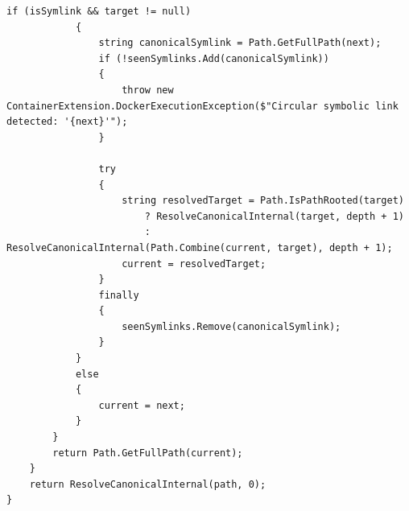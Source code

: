 \begin{lstlisting}[language=CSharp, caption={Path Canonicalization implementation}, label={lst:canonicalization}]
            if (isSymlink && target != null)
            {
                string canonicalSymlink = Path.GetFullPath(next);
                if (!seenSymlinks.Add(canonicalSymlink))
                {
                    throw new ContainerExtension.DockerExecutionException($"Circular symbolic link detected: '{next}'");
                }

                try
                {
                    string resolvedTarget = Path.IsPathRooted(target) 
                        ? ResolveCanonicalInternal(target, depth + 1)
                        : ResolveCanonicalInternal(Path.Combine(current, target), depth + 1);
                    current = resolvedTarget;
                }
                finally
                {
                    seenSymlinks.Remove(canonicalSymlink);
                }
            }
            else
            {
                current = next;
            }
        }
        return Path.GetFullPath(current);
    }
    return ResolveCanonicalInternal(path, 0);
}
\end{lstlisting}

